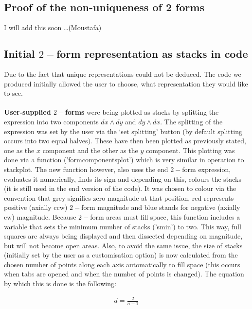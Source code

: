 \documentclass[12pt]{report}
\begin{document}
\subsection{Proof of the non-uniqueness of 2 forms}

I will add this soon \dots (Moustafa)

\subsection{Initial $2-$form representation as stacks in code}
Due to the fact that unique representations could not be deduced. The code we produced initially allowed the user to choose, what representation they would like to see.\\~\\

\textbf{User-supplied $2-$forms} were being plotted as stacks by splitting the expression into two components $dx\wedge dy$ and $dy\wedge dx$. The splitting of the expression was set by the user via the `set splitting' button (by default splitting occurs into two equal halves). These have then been plotted as previously stated, one as the $x$ component and the other as the $y$ component. This plotting was done via a function ('form\textunderscore components\textunderscore plot') which is very similar in operation to stack\textunderscore plot. The new function however, also uses the end $2-$form expression, evaluates it numerically, finds its sign and depending on this, colours the stacks (it is still used in the end version of the code). It was chosen to colour via the convention that grey signifies zero magnitude at that position, red represents positive (axially ccw) $2-$form magnitude and blue stands for negative (axially cw) magnitude. Because $2-$form areas must fill space, this function includes a variable that sets the minimum number of stacks ('s\textunderscore min') to two. This way, full squares are always being displayed and then dissected depending on magnitude, but will not become open areas. Also, to avoid the same issue, the size of stacks (initially set by the user as a customisation option) is now calculated from the chosen number of points along each axis automatically to fill space (this occurs when tabs are opened and when the number of points is changed). The equation by which this is done is the following:

\begin{equation}
	\label{T2} \begin{split}
		d = \frac{2}{n-1}
	\end{split}
\end{equation}
\end{document}

